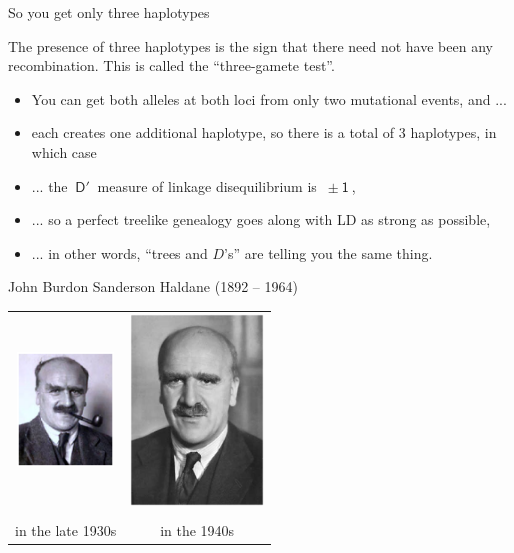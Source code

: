 \documentclass[bluish,slideColor,colorBG,pdf]{prosper}
\begin{document}
\begin{slide}[Replace]{So you get only three haplotypes}
\bigskip

The presence of three haplotypes is the sign that there need not have been any
recombination.  This is called the ``three-gamete test''.
\bigskip

\begin{itemize}
\item You can get both alleles at both loci from only two mutational events,
and ...
\item each creates one additional haplotype, so there is a total of 3
haplotypes, in which case
\item ... the $\mathsf{~D'~}$ measure of linkage disequilibrium is $\mathsf{~\pm
1~}$, 
\item ... so a perfect treelike genealogy goes along with LD as strong as
possible,
\item ... in other words, ``trees and $D$'s'' are telling you the same thing.
\end{itemize}

\end{slide}

\begin{slide}[Replace]{John Burdon Sanderson Haldane (1892 -- 1964) }

\begin{center}
\begin{tabular}{c c}
\includegraphics[height=1.2in]{haldane1930s.ps} &
\includegraphics[height=2in]{Haldane2.ps}\\
& \\
in the late 1930s & in the 1940s \\
\end{tabular}
\end{center}

\end{slide}
\end{document}
